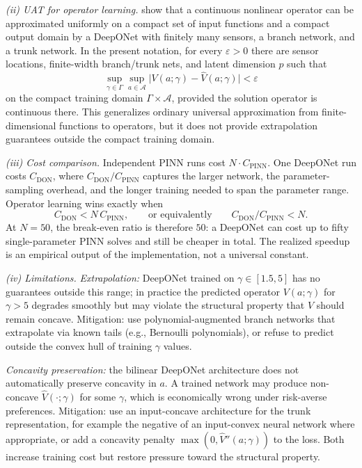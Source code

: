 \documentclass[11pt,a4paper]{report}
\begin{document}
\emph{(ii) UAT for operator learning.}  \citet{lu2021learning} show that a continuous nonlinear operator can be approximated uniformly on a compact set of input functions and a compact output domain by a DeepONet with finitely many sensors, a branch network, and a trunk network.  In the present notation, for every $\varepsilon>0$ there are sensor locations, finite-width branch/trunk nets, and latent dimension $p$ such that
\[
   \sup_{\gamma\in\Gamma}\sup_{a\in\mathcal A}
   \bigl|V(a;\gamma)-\widehat V(a;\gamma)\bigr|
   < \varepsilon
\]
on the compact training domain $\Gamma\times\mathcal A$, provided the solution operator is continuous there.  This generalizes ordinary universal approximation from finite-dimensional functions to operators, but it does not provide extrapolation guarantees outside the compact training domain.

\emph{(iii) Cost comparison.}  Independent PINN runs cost $N \cdot C_\mathrm{PINN}$.  One DeepONet run costs $C_\mathrm{DON}$, where $C_\mathrm{DON}/C_\mathrm{PINN}$ captures the larger network, the parameter-sampling overhead, and the longer training needed to span the parameter range.  Operator learning wins exactly when
\[
   C_\mathrm{DON} < N\,C_\mathrm{PINN},
   \qquad\text{or equivalently}\qquad
   C_\mathrm{DON}/C_\mathrm{PINN} < N .
\]
At $N=50$, the break-even ratio is therefore $50$: a DeepONet can cost up to fifty single-parameter PINN solves and still be cheaper in total.  The realized speedup is an empirical output of the implementation, not a universal constant.

\emph{(iv) Limitations.}  \emph{Extrapolation:} DeepONet trained on $\gamma \in [1.5, 5]$ has no guarantees outside this range; in practice the predicted operator $V(a; \gamma)$ for $\gamma > 5$ degrades smoothly but may violate the structural property that $V$ should remain concave.  Mitigation: use polynomial-augmented branch networks that extrapolate via known tails (e.g., Bernoulli polynomials), or refuse to predict outside the convex hull of training $\gamma$ values.

\emph{Concavity preservation:} the bilinear DeepONet architecture does not automatically preserve concavity in $a$.  A trained network may produce non-concave $\widehat{V}(\cdot; \gamma)$ for some $\gamma$, which is economically wrong under risk-averse preferences.  Mitigation: use an input-concave architecture for the trunk representation, for example the negative of an input-convex neural network where appropriate, or add a concavity penalty $\max(0,\widehat{V}''(a;\gamma))$ to the loss.  Both increase training cost but restore pressure toward the structural property.


\end{document}
